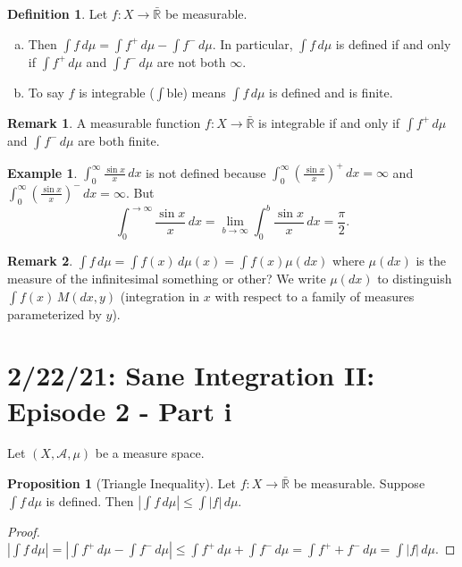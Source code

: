 \documentclass{article}
\newcommand{\R}{\mathbb{R}}
\theoremstyle{definition}
\newtheorem{proposition}[theorem]{Proposition}
\newtheorem*{example}{Example}
\newtheorem*{definition}{Definition}
\newtheorem*{remark}{Remark}
\begin{document}
\begin{definition}
Let $f : X \longrightarrow \bar{\R}$ be measurable.
\begin{enumerate}[(a)]
    \item Then $\int f\,d\mu = \int f^+\,d\mu - \int f^-\,d\mu$. In particular, $\int f\,d\mu$ is defined if and only if $\int f^+\,d\mu$ and $\int f^-\,d\mu$ are not both $\infty$.
    \item To say $f$ is integrable ($\int$ble) means $\int f\,d\mu$ is defined and is finite.
\end{enumerate}
\end{definition}
\begin{remark}
A measurable function $f : X \longrightarrow \bar{\R}$ is integrable if and only if $\int f^+ \,d\mu$ and $\int f^-\,d\mu$ are both finite.
\end{remark}
\begin{example}
$\int_0^\infty \frac{\sin x}{x}\,dx$ is not defined because $\int_0^\infty \left( \frac{\sin x}{x} \right)^+ \,dx = \infty$ and $\int_0^\infty \left( \frac{\sin x}{x} \right)^- \,dx = \infty$.
But
\[\int_0^{\to\infty} \frac{\sin x}{x}\,dx = \lim_{b\to\infty} \int_0^b \frac{\sin x}{x}\,dx = \frac{\pi}{2}.\]
\end{example}

\begin{remark}
$\int f\,d\mu = \int f(x)\,d\mu(x) = \int f(x)\mu(dx)$
where $\mu(dx)$ is the measure of the infinitesimal something or other?
We write $\mu(dx)$ to distinguish $\int f(x)\,M(dx, y)$ (integration in $x$ with respect to a family of measures parameterized by $y$).
\end{remark}

\section*{2/22/21: Sane Integration II: Episode 2 - Part i}

Let $(X, \mathscr{A}, \mu)$ be a measure space.
\begin{proposition}[Triangle Inequality]
Let $f:X\longrightarrow\bar{\R}$ be measurable. Suppose $\int f\,d\mu$ is defined. Then $|\int f\,d\mu| \leq \int |f|\,d\mu$.
\end{proposition}
\begin{proof}
    $|\int f\,d\mu| = |\int f^+\,d\mu - \int f^-\,d\mu| \leq \int f^+\,d\mu + \int f^-\,d\mu = \int f^+ + f^-\,d\mu = \int |f|\,d\mu.$
\end{proof}
\end{document}
